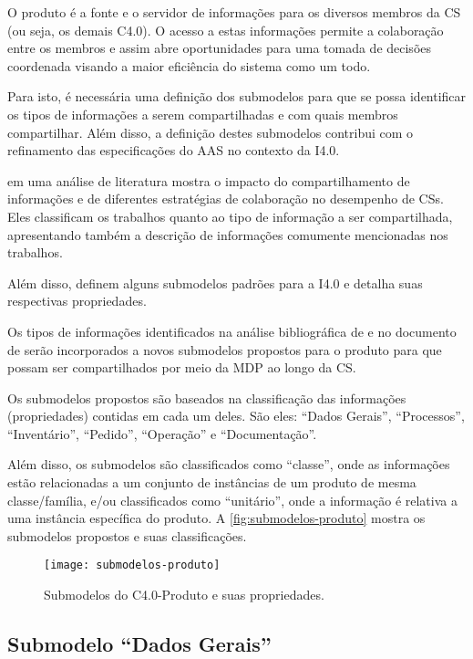 O produto é a fonte e o servidor de informações para os diversos membros da CS (ou seja, os demais C4.0). O acesso a estas informações permite a colaboração entre os membros e assim abre oportunidades para uma tomada de decisões coordenada visando a maior eficiência do sistema como um todo.

Para isto, é necessária uma definição dos submodelos para que se possa identificar os tipos de informações a serem compartilhadas e com quais membros compartilhar. Além disso, a definição destes submodelos contribui com o refinamento das especificações do AAS no contexto da I4.0.

 em uma análise de literatura mostra o impacto do compartilhamento de informações e de diferentes estratégias de colaboração no desempenho de CSs. Eles classificam os trabalhos quanto ao tipo de informação a ser compartilhada, apresentando também a descrição de informações comumente mencionadas nos trabalhos.

Além disso,  definem alguns submodelos padrões para a I4.0 e detalha suas respectivas propriedades.

Os tipos de informações identificados na análise bibliográfica de  e no documento de  serão incorporados a novos submodelos propostos para o produto para que possam ser compartilhados por meio da MDP ao longo da CS.

Os submodelos propostos são baseados na classificação das informações (propriedades) contidas em cada um deles. São eles: ``Dados Gerais'', ``Processos'', ``Inventário'', ``Pedido'', ``Operação'' e ``Documentação''.

Além disso, os submodelos são classificados como ``classe'', onde as informações estão relacionadas a um conjunto de instâncias de um produto de mesma classe/família, e/ou classificados como ``unitário'', onde a informação é relativa a uma instância específica do produto. A \autoref{fig:submodelos-produto} mostra os submodelos propostos e suas classificações.

\begin{figure}[htb]
	\centering
	\texttt{[image: submodelos-produto]}
	\caption{Submodelos do C4.0-Produto e suas propriedades.}
	\label{fig:submodelos-produto}
\end{figure}

\subsection{Submodelo ``Dados Gerais''}

